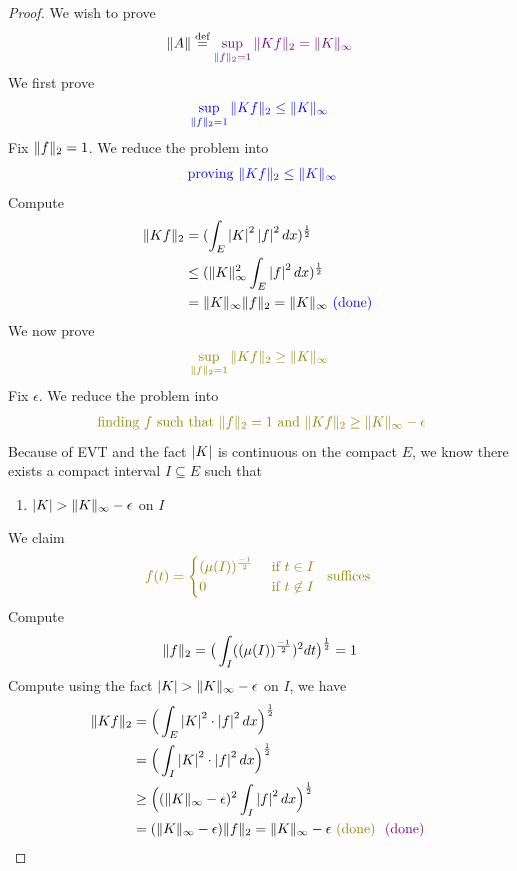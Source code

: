\documentclass{report}
\begin{document}
\begin{proof}
We wish to prove 
\begin{align*}
\| A \|\overset{\text{def}}{=}\textcolor{violet}{\sup_{\| f \|_2=1}\| Kf \|_2=\| K \|_\infty}
\end{align*}
We first prove 
\begin{align*}
\textcolor{blue}{\sup_{\| f \|_2=1}\| Kf \|_2\leq \| K \|_\infty}
\end{align*}
Fix $\| f \|_2=1$. We reduce the problem into 
\begin{align*}
\textcolor{blue}{\text{ proving }\| Kf \|_2\leq \| K \|_\infty}
\end{align*}
Compute 
\begin{align*}
\| Kf \|_2&=(\int_E \left|K\right|^2 \left|f\right|^2dx)^{\frac{1}{2}}\\
&\leq (\| K \|_\infty^{2}\int_E \left|f\right|^2dx)^{\frac{1}{2}}\\
&= \| K \|_\infty \| f \|_2=\| K \|_\infty\textcolor{blue}{\text{ (done) }}
\end{align*}
We now prove 
\begin{align*}
\olive{\sup_{\norm{f}_2= 1}\norm{Kf}_2\geq \norm{K}_\infty}
\end{align*}
Fix $\epsilon $. We reduce the problem into 
\begin{align*}
\olive{\text{ finding }f\text{ such that }\norm{f}_2=1\text{ and }\norm{Kf}_2\geq \norm{K}_\infty -\epsilon }
\end{align*}
Because of EVT and the fact $\left|K\right|$ is continuous on the compact $E$, we know there exists a compact interval $I\subseteq E$ such that  
\begin{enumerate}[label=(\alph*)]
  \item $\abso{K}>\norm{K}_\infty-\epsilon $ on $I$
\end{enumerate}
We claim 
\begin{align*}
\olive{f(t)=\begin{cases}
    (\mu (I))^{\frac{-1}{2}}& \text{ if $t\in I$ }\\
  0& \text{ if $t\not\in I$ }
\end{cases}\text{ suffices }}
\end{align*}
Compute 
\begin{align*}
\| f \|_2= \big(\int_I ((\mu (I))^{\frac{-1}{2}})^2dt \big) ^{\frac{1}{2}}=1
\end{align*}
Compute using the fact $\abso{K}>\norm{K}_\infty-\epsilon $ on $I$, we have 
\begin{align*}
\norm{Kf}_2&= \Big(\int_E \abso{K}^2 \cdot \abso{f}^2dx \Big)^{\frac{1}{2}}\\
&= \Big(\int_I \abso{K}^2\cdot \abso{f}^2dx \Big)^{\frac{1}{2}}\\
&\geq \Big((\norm{K}_\infty -\epsilon )^2 \int_I \abso{f}^2 dx\Big)^{\frac{1}{2}}\\
&=(\norm{K}_\infty - \epsilon )\norm{f}_2 =\norm{K}_\infty - \epsilon \odone \vdone 
\end{align*}




\end{proof}
\end{document}
